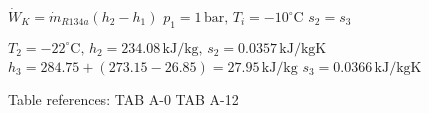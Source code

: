 \( \dot{W}_K = \dot{m}_{R134a} (h_2 - h_1) \)  
\( p_1 = 1 \, \text{bar}, \, T_i = -10^\circ \text{C} \)  
\( s_2 = s_3 \)  

\( T_2 = -22^\circ \text{C}, \, h_2 = 234.08 \, \text{kJ/kg}, \, s_2 = 0.0357 \, \text{kJ/kgK} \)  
\( h_3 = 284.75 + (273.15 - 26.85) = 27.95 \, \text{kJ/kg} \)  
\( s_3 = 0.0366 \, \text{kJ/kgK} \)  

Table references:  
TAB A-0  
TAB A-12